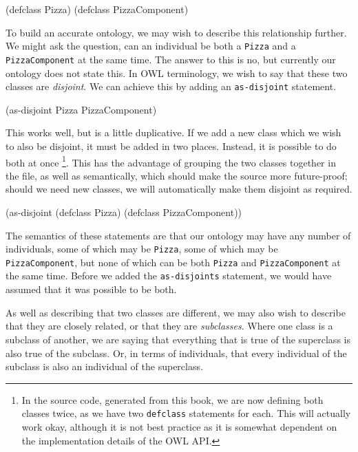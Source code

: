 \begin{tawny}
(defclass Pizza)
(defclass PizzaComponent)
\end{tawny}

To build an accurate ontology, we may wish to describe this relationship
further. We might ask the question, can an individual be both a \verb~Pizza~
and a \verb~PizzaComponent~ at the same time. The answer to this is no, but
currently our ontology does not state this. In OWL terminology, we wish
to say that these two classes are \emph{disjoint}. We can achieve this by
adding an \verb~as-disjoint~ statement.

\begin{tawny}
(as-disjoint Pizza PizzaComponent)
\end{tawny}

This works well, but is a little duplicative. If we add a new class
which we wish to also be disjoint, it must be added in two places.
Instead, it is possible to do both at once \footnote{In the source code,
generated from this book, we are now defining both classes twice, as we
have two \verb~defclass~ statements for each. This will actually work okay,
although it is not best practice as it is somewhat dependent on the
implementation details of the OWL API.}. This has the advantage of
grouping the two classes together in the file, as well as semantically,
which should make the source more future-proof; should we need new
classes, we will automatically make them disjoint as required.

\begin{tawny}
(as-disjoint
 (defclass Pizza)
 (defclass PizzaComponent))
\end{tawny}

The semantics of these statements are that our ontology may have any
number of individuals, some of which may be \verb~Pizza~, some of which may
be \verb~PizzaComponent~, but none of which can be both \verb~Pizza~ and
\verb~PizzaComponent~ at the same time. Before we added the \verb~as-disjoints~
statement, we would have assumed that it was possible to be both.

As well as describing that two classes are different, we may also wish
to describe that they are closely related, or that they are
\emph{subclasses}. Where one class is a subclass of another, we are saying
that everything that is true of the superclass is also true of the
subclass. Or, in terms of individuals, that every individual of the
subclass is also an individual of the superclass.

